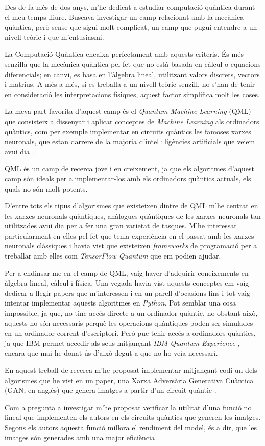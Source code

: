 Des de fa més de dos anys, m'he dedicat a estudiar computació quàntica durant el meu temps lliure. Buscava investigar un camp relacionat amb la mecànica quàntica, però sense que sigui molt complicat, un camp que pugui entendre a un nivell teòric i que m'entusiasmi.

La Computació Quàntica encaixa perfectament amb aquests criteris. És més senzilla que la mecànica quàntica pel fet que no està basada en càlcul o equacions diferencials; en canvi, es basa en l'àlgebra lineal, utilitzant valors discrets, vectors i matrius. A més a més, si es treballa a un nivell teòric senzill, no s'han de tenir en consideració les interpretacions físiques, aquest factor simplifica molt les coses.

La meva part favorita d'aquest camp és el \textit{Quantum Machine Learning} (QML) que consisteix a dissenyar i aplicar conceptes de \textit{Machine Learning} als ordinadors quàntics, com per exemple implementar en circuits quàntics les famoses xarxes neuronals, que estan darrere de la majoria d'intel·ligències artificials que veiem avui dia \cite{schuld:2014}.

QML és un camp de recerca jove i en creixement, ja que els algoritmes d'aquest camp són ideals per a implementar-los amb els ordinadors quàntics actuals, els quals no són molt potents.

D'entre tots els tipus d'algorismes que existeixen dintre de QML m'he centrat en les xarxes neuronals quàntiques, anàlogues quàntiques de les xarxes neuronals tan utilitzades avui dia per a fer una gran varietat de tasques. M'he interessat particularment en elles pel fet que tenia experiència en el passat amb les xarxes neuronals clàssiques i havia vist que existeixen \textit{frameworks} de programació per a treballar amb elles com \textit{TensorFlow Quantum} \cite{tfq} que em podien ajudar.

Per a endinsar-me en el camp de QML, vaig haver d'adquirir coneixements en àlgebra lineal, càlcul i física. Una vegada havia vist aquests conceptes em vaig dedicar a llegir papers que m'interessen i en un parell d'ocasions fins i tot vaig intentar implementar aquests algoritmes en \textit{Python}. Pot semblar una cosa impossible, ja que, no tinc accés directe a un ordinador quàntic, no obstant això, aquests no són necessaris perquè les operacions quàntiques poden ser simulades en un ordinador corrent d'escriptori. Però puc tenir accés a ordinadors quàntics, ja que IBM permet accedir als seus mitjançant \textit{IBM Quantum Experience} \cite{IBM_Q}, encara que mai he donat ús d'això degut a que no ho veia necessari.

En aquest treball de recerca m'he proposat implementar mitjançant codi un dels algorismes que he vist en un paper, una Xarxa Adversària Generativa Cuàntica (GAN, en anglès) \cite{GAN2014} que genera imatges a partir d'un circuit quàntic \cite{QGAN_exp}.

Com a pregunta a investigar m'he proposat verificar la utilitat d'una funció no lineal que implementen els autors en els circuits quàntics que generen les imatges. Segons els autors aquesta funció millora el rendiment del model, és a dir, que les imatges són generades amb una major eficiència \cite{QGAN_exp}.


